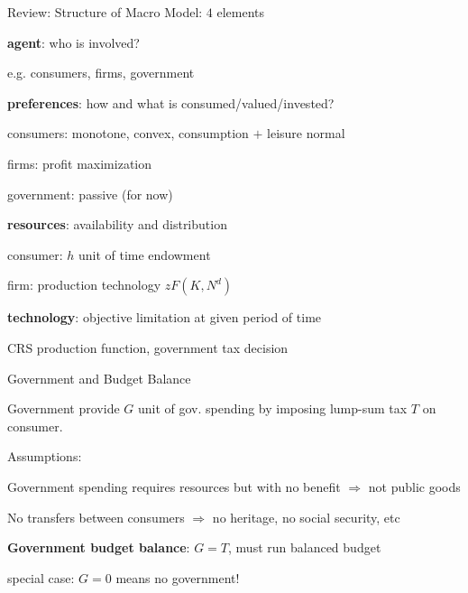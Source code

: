 \documentclass[11pt,aspectratio=169,usenames,dvipsnames]{beamer}
\let\tempone\itemize
\let\temptwo\enditemize
\renewenvironment{itemize}{\tempone\addtolength{\itemsep}{\fill}}{\temptwo}
\let\tempa\enumerate
\let\tempb\endenumerate
\renewenvironment{enumerate}{\tempa\addtolength{\itemsep}{\fill}}{\tempb}
\begin{document}
\begin{frame}{Review: Structure of Macro Model: $ 4 $ elements}
\label{slide:Structure_of_Macro_Model____4___elements}
\begin{enumerate}
    \item \textbf{agent}: who is involved?
    \begin{itemize}
        \item e.g. consumers, firms, \alert{government}
    \end{itemize}
    \item \textbf{preferences}: how and what is consumed/valued/invested?
    \begin{itemize}
        \item \alert{consumers}: monotone, convex, consumption $+$ leisure normal
        \item \alert{firms}: profit maximization
        \item \alert{government}: passive (for now)
    \end{itemize}
    \item \textbf{resources}: availability and distribution
    \begin{itemize}
        \item \alert{consumer}: $ h $ unit of time endowment
        \item \alert{firm}: production technology $ z F( K, N^{d} ) $
    \end{itemize}
    \item \textbf{technology}: objective limitation at given period of time
    \begin{itemize}
        \item CRS production function, government tax decision
    \end{itemize}
\end{enumerate}
\end{frame}

\begin{frame}{Government and Budget Balance}
\label{slide:Government_and_Budget_Balance}
\begin{itemize}
    \item Government provide $ G $ unit of gov. spending by imposing \alert{lump-sum tax} $ T $ on consumer.
    \item Assumptions:
    \begin{enumerate}
        \item Government spending requires resources but with \alert{no benefit} $ \Rightarrow $ not \alert{public goods}
        \item No transfers between consumers $ \Rightarrow  $ no heritage, no social security, etc
        \item \textbf{Government budget balance}: $ G = T $, must run balanced budget
        \begin{itemize}
            \item special case: $ G=0 $ means no government!
        \end{itemize}
    \end{enumerate}
\end{itemize}
\end{frame}
\end{document}
